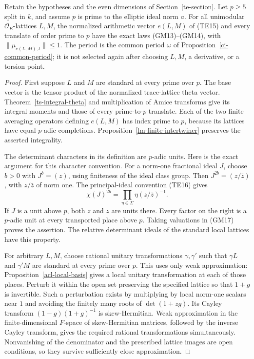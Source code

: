 \begin{theorem}\label{gm-arithmetic-unit-bound}
Retain the hypotheses and the even dimensions of
Section~\ref{te-section}.  Let $p\ge5$ split in $k$, and
assume $p$ is prime to the elliptic ideal norm $a$.
For all unimodular $\mathcal O_E$-lattices $L,M$, the
normalized arithmetic vector $e(L,M)$ of (TE15)
and every translate of order prime to $p$ have the exact
laws (GM13)--(GM14), with $\|\mu_{e(L,M),t}\|\le1$.
The period is the common period $\omega$ of
Proposition~\ref{ci-common-period}; it is not selected again
after choosing $L,M$, a derivative, or a torsion point.
\end{theorem}
\begin{proof}
First suppose $L$ and $M$ are standard at every prime over
$p$.  The base vector is the tensor product of the normalized
trace-lattice theta vector.  Theorem~\ref{ts-integral-theta}
and multiplication of Amice transforms give its integral
moments and those of every prime-to-$p$ translate.
Each of the two finite averaging operators defining $e(L,M)$
has index prime to $p$, because its lattices have equal
$p$-adic completions.  Proposition~\ref{lm-finite-intertwiner}
preserves the asserted integrality.

The determinant characters in its definition are $p$-adic
units.  Here is the exact argument for this character convention.
For a norm-one fractional ideal $J$, choose $b>0$ with
$J^b=(z)$, using finiteness of the ideal class group.  Then
$J^{2b}=(z/\bar z)$, with $z/\bar z$ of norm one.  The
principal-ideal convention (TE16) gives
\[
            \chi(J)^{2b}
                   =\prod_{\eta\in\Sigma}\eta(z/\bar z)^{-1}.
                                                               \tag{GM17}
\]
If $J$ is a unit above $p$, both $z$ and $\bar z$ are
units there.  Every factor on the right is a $p$-adic unit
at every transported place above $p$.  Taking valuations in
(GM17) proves the assertion.  The relative determinant ideals
of the standard local lattices have this property.

For arbitrary $L,M$, choose rational unitary transformations
$\gamma,\gamma'$ such that $\gamma L$ and $\gamma'M$
are standard at every prime over $p$.  This uses only weak
approximation: Proposition~\ref{acl-local-basis} gives a local
unitary transformation at each of those places.  Perturb it
within the open set preserving the specified lattice so that
$1+g$ is invertible.  Such a perturbation exists by multiplying
by local norm-one scalars near $1$ and avoiding the finitely
many roots of $\det(1+zg)$.  Its Cayley transform
$(1-g)(1+g)^{-1}$ is skew-Hermitian.  Weak approximation in
the finite-dimensional $F$-space of skew-Hermitian matrices,
followed by the inverse Cayley transform, gives the required
rational transformations simultaneously.  Nonvanishing of
the denominator and the prescribed lattice images are open
conditions, so they survive sufficiently close approximation.


\end{proof}
